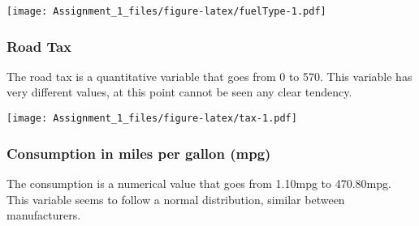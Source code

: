 \documentclass[
]{article}
\newenvironment{Shaded}{\begin{snugshade}}{\end{snugshade}}
\newcommand{\AttributeTok}[1]{\textcolor[rgb]{0.77,0.63,0.00}{#1}}
\newcommand{\CommentTok}[1]{\textcolor[rgb]{0.56,0.35,0.01}{\textit{#1}}}
\newcommand{\DecValTok}[1]{\textcolor[rgb]{0.00,0.00,0.81}{#1}}
\newcommand{\FunctionTok}[1]{\textcolor[rgb]{0.00,0.00,0.00}{#1}}
\newcommand{\NormalTok}[1]{#1}
\newcommand{\SpecialCharTok}[1]{\textcolor[rgb]{0.00,0.00,0.00}{#1}}
\newcommand{\StringTok}[1]{\textcolor[rgb]{0.31,0.60,0.02}{#1}}
\begin{document}
\texttt{[image: Assignment\_1\_files/figure-latex/fuelType-1.pdf]}

\newpage

\hypertarget{road-tax}{%
\subsubsection{Road Tax}\label{road-tax}}

The road tax is a quantitative variable that goes from 0 to 570. This
variable has very different values, at this point cannot be seen any
clear tendency.

\begin{Shaded}
\end{Shaded}

\texttt{[image: Assignment\_1\_files/figure-latex/tax-1.pdf]}

\newpage

\hypertarget{consumption-in-miles-per-gallon-mpg}{%
\subsubsection{Consumption in miles per gallon
(mpg)}\label{consumption-in-miles-per-gallon-mpg}}

The consumption is a numerical value that goes from 1.10mpg to
470.80mpg. This variable seems to follow a normal distribution, similar
between manufacturers.
\end{document}
